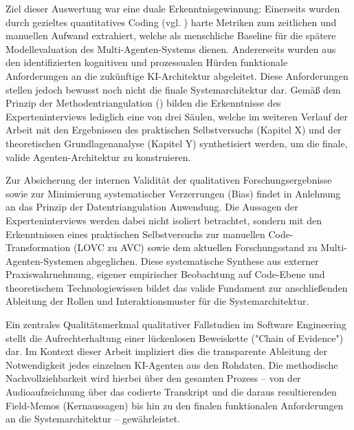 Ziel dieser Auswertung war eine duale Erkenntnisgewinnung: Einerseits wurden durch gezieltes quantitatives Coding (vgl. \textcite{seamanQualitativeMethodsEmpirical1999}) harte Metriken zum zeitlichen und manuellen Aufwand extrahiert, welche als menschliche Baseline für die spätere Modellevaluation des Multi-Agenten-Systems dienen. Andererseits wurden aus den identifizierten kognitiven und prozessualen Hürden funktionale Anforderungen an die zukünftige KI-Architektur abgeleitet. Diese Anforderungen stellen jedoch bewusst noch nicht die finale Systemarchitektur dar. Gemäß dem Prinzip der Methodentriangulation (\textcite{runesonGuidelinesConductingReporting2009}) bilden die Erkenntnisse des Experteninterviews lediglich eine von drei Säulen, welche im weiteren Verlauf der Arbeit mit den Ergebnissen des praktischen Selbstversuchs (Kapitel X) und der theoretischen Grundlagenanalyse (Kapitel Y) synthetisiert werden, um die finale, valide Agenten-Architektur zu konstruieren.

Zur Absicherung der internen Validität der qualitativen Forschungsergebnisse sowie zur Minimierung systematischer Verzerrungen (Bias) findet in Anlehnung an \textcite{runesonGuidelinesConductingReporting2009} das Prinzip der Datentriangulation Anwendung. Die Aussagen der Experteninterviews werden dabei nicht isoliert betrachtet, sondern mit den Erkenntnissen eines praktischen Selbstversuchs zur manuellen Code-Transformation (LOVC zu AVC) sowie dem aktuellen Forschungsstand zu Multi-Agenten-Systemen abgeglichen. Diese systematische Synthese aus externer Praxiswahrnehmung, eigener empirischer Beobachtung auf Code-Ebene und theoretischem Technologiewissen bildet das valide Fundament zur anschließenden Ableitung der Rollen und Interaktionsmuster für die Systemarchitektur.

Ein zentrales Qualitätsmerkmal qualitativer Fallstudien im Software Engineering stellt die Aufrechterhaltung einer lückenlosen Beweiskette ("Chain of Evidence") dar. Im Kontext dieser Arbeit impliziert dies die transparente Ableitung der Notwendigkeit jedes einzelnen KI-Agenten aus den Rohdaten. Die methodische Nachvollziehbarkeit wird hierbei über den gesamten Prozess – von der Audioaufzeichnung über das codierte Transkript und die daraus resultierenden Field-Memos (Kernaussagen) bis hin zu den finalen funktionalen Anforderungen an die Systemarchitektur – gewährleistet. \parencite{runesonGuidelinesConductingReporting2009}


